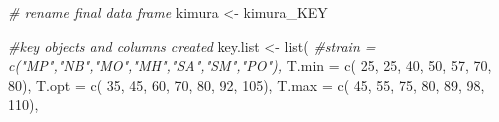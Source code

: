 \documentclass[
]{book}
\newenvironment{Shaded}{\begin{snugshade}}{\end{snugshade}}
\newcommand{\AttributeTok}[1]{\textcolor[rgb]{0.77,0.63,0.00}{#1}}
\newcommand{\CommentTok}[1]{\textcolor[rgb]{0.56,0.35,0.01}{\textit{#1}}}
\newcommand{\DecValTok}[1]{\textcolor[rgb]{0.00,0.00,0.81}{#1}}
\newcommand{\FunctionTok}[1]{\textcolor[rgb]{0.00,0.00,0.00}{#1}}
\newcommand{\NormalTok}[1]{#1}
\newcommand{\OtherTok}[1]{\textcolor[rgb]{0.56,0.35,0.01}{#1}}
\begin{document}
\begin{Shaded}
\begin{Highlighting}[]
\CommentTok{\# rename final data frame}
\NormalTok{kimura }\OtherTok{\textless{}{-}}\NormalTok{ kimura\_KEY}

\CommentTok{\#key objects and columns created}
\NormalTok{key.list }\OtherTok{\textless{}{-}} \FunctionTok{list}\NormalTok{( }\CommentTok{\#strain = c("MP","NB","MO","MH","SA","SM","PO"),    }
\AttributeTok{T.min =} \FunctionTok{c}\NormalTok{( }\DecValTok{25}\NormalTok{,  }\DecValTok{25}\NormalTok{,  }\DecValTok{40}\NormalTok{,  }\DecValTok{50}\NormalTok{,  }\DecValTok{57}\NormalTok{,  }\DecValTok{70}\NormalTok{,  }\DecValTok{80}\NormalTok{),    }
\AttributeTok{T.opt =} \FunctionTok{c}\NormalTok{( }\DecValTok{35}\NormalTok{,  }\DecValTok{45}\NormalTok{,  }\DecValTok{60}\NormalTok{,  }\DecValTok{70}\NormalTok{,  }\DecValTok{80}\NormalTok{,  }\DecValTok{92}\NormalTok{,  }\DecValTok{105}\NormalTok{),     }
\AttributeTok{T.max =} \FunctionTok{c}\NormalTok{( }\DecValTok{45}\NormalTok{,  }\DecValTok{55}\NormalTok{,  }\DecValTok{75}\NormalTok{,  }\DecValTok{80}\NormalTok{,  }\DecValTok{89}\NormalTok{,  }\DecValTok{98}\NormalTok{,  }\DecValTok{110}\NormalTok{),}


\end{Highlighting}
\end{Shaded}
\end{document}
